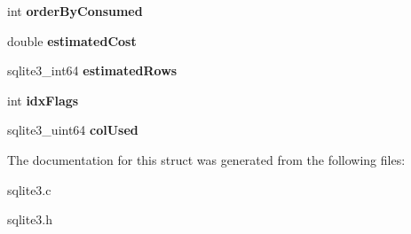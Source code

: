 \begin{DoxyCompactItemize}
\item 
int {\bfseries order\+By\+Consumed}\hypertarget{structsqlite3__index__info_a5515d9de0f37f68d7e0930c20a668b29}{}\label{structsqlite3__index__info_a5515d9de0f37f68d7e0930c20a668b29}

\item 
double {\bfseries estimated\+Cost}\hypertarget{structsqlite3__index__info_aa8b4fe1d2ee38aab57ba5e1da00d7830}{}\label{structsqlite3__index__info_aa8b4fe1d2ee38aab57ba5e1da00d7830}

\item 
sqlite3\+\_\+int64 {\bfseries estimated\+Rows}\hypertarget{structsqlite3__index__info_adcdf25dcf9848a6fedf539bb9c921b7f}{}\label{structsqlite3__index__info_adcdf25dcf9848a6fedf539bb9c921b7f}

\item 
int {\bfseries idx\+Flags}\hypertarget{structsqlite3__index__info_a8acf2a7efbc3e193cf01d2afbd44fdbb}{}\label{structsqlite3__index__info_a8acf2a7efbc3e193cf01d2afbd44fdbb}

\item 
sqlite3\+\_\+uint64 {\bfseries col\+Used}\hypertarget{structsqlite3__index__info_a99787169e2f78c0728bdb339c4107a2e}{}\label{structsqlite3__index__info_a99787169e2f78c0728bdb339c4107a2e}

\end{DoxyCompactItemize}


The documentation for this struct was generated from the following files\+:\begin{DoxyCompactItemize}
\item 
sqlite3.\+c\item 
sqlite3.\+h\end{DoxyCompactItemize}
